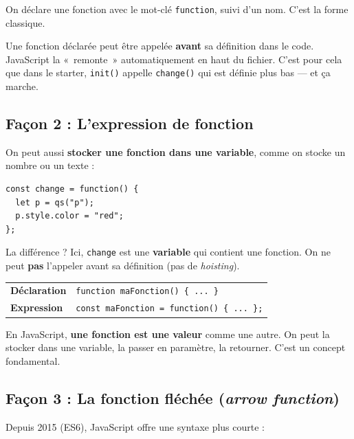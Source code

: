 \documentclass[11pt,a4paper]{article}
\begin{document}
On déclare une fonction avec le mot-clé \texttt{function}, suivi d'un nom. C'est la forme classique.

\begin{infobox}
Une fonction déclarée peut être appelée \textbf{avant} sa définition dans le code. JavaScript la «~remonte~» automatiquement en haut du fichier. C'est pour cela que dans le starter, \texttt{init()} appelle \texttt{change()} qui est définie plus bas --- et ça marche.
\end{infobox}

\subsection{Façon 2 : L'expression de fonction}

On peut aussi \textbf{stocker une fonction dans une variable}, comme on stocke un nombre ou un texte :

\begin{lstlisting}
const change = function() {
  let p = qs("p");
  p.style.color = "red";
};
\end{lstlisting}

La différence ? Ici, \texttt{change} est une \textbf{variable} qui contient une fonction. On ne peut \textbf{pas} l'appeler avant sa définition (pas de \emph{hoisting}).

\begin{retenirbox}[À retenir]
\begin{center}
\begin{tabular}{lp{6cm}}
\toprule
\textbf{Déclaration} & \texttt{function maFonction() \{ ... \}} \\
\textbf{Expression} & \texttt{const maFonction = function() \{ ... \};} \\
\bottomrule
\end{tabular}
\end{center}
En JavaScript, \textbf{une fonction est une valeur} comme une autre. On peut la stocker dans une variable, la passer en paramètre, la retourner. C'est un concept fondamental.
\end{retenirbox}

\subsection{Façon 3 : La fonction fléchée (\emph{arrow function})}

Depuis 2015 (ES6), JavaScript offre une syntaxe plus courte :
\end{document}
